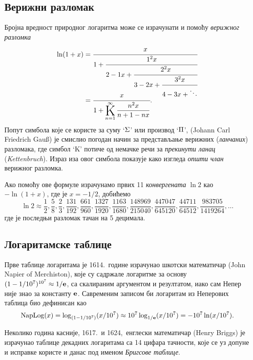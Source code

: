 \subsection{Верижни разломак}

Бројна вредност природног логаритма може се израчунати и помоћу {\sl верижног разломка}
\begin{equation}\label{eq:verige}
\begin{aligned}
\ln(1+x)
&=\cfrac{x}{1+\cfrac{1^2x}{2-1x+\cfrac{2^2x}{3-2x+\cfrac{3^2x}{4-3x+\ddots}}}}\\
\noalign{\vskip-12pt}
&=\cfrac{x}{1+ \Kinf{\n^2x}{\n+1-\n x}}.
\end{aligned}
\end{equation}
Попут симбола које се користе за суму `$\rm\Sigma$' или производ `$\rm\Pi$', 
 (Johann Carl Friedrich Gau\ss) је смислио погодан начин за представљање
верижних ({\sl ланчаних\/}) разломака,
где симбол `K' потиче од немачке речи за {\sl прекинути ланац\/} ({\sl Kettenbruch\/}).
Израз иза овог симбола показује како изгледа {\sl општи члан\/} верижног разломка.

\def\ff#1/#2,{\frac{#1}{#2},}
Ако помоћу ове формуле израчунамо првих 11 {\sl конвергената\/} $\ln2$ као $-\ln(1+x)$, 
где је $x=-1/2$,
добићемо
$$
\ln2\approx\ff1/2, \ff5/8, \ff2/3, \ff131/192, \ff661/960, \ff1327/1920, \ff1163/1680, \ff148969/215040, 
\ff447047/645120, \ff44711/64512, \ff983705/1419264, \dots
$$
где је последњи разломак тачан на 5 децимала.


\subsection{Логаритамске таблице}

Прве таблице логаритама је 1614.\ године 
израчунао шкотски математичар  (John Napier of Merchiston),
које су садржале логаритме за основу $(1-1/10^7)^{10^7} \approx1/{\bf e}$, 
са скалираним аргументом и резултатом,
иако сам Непер није знао за константу ${\bf e}$.
Савременим записом би логаритам из Неперових таблица био дефинисан као
$$
\mathop{\rm NapLog}\nolimits (x) = \log_{(1-1/10^7)}(x/10^7)
\approx 10^7\log_{1/{\bf e}}(x/10^7) = -10^7\ln(x/10^7).
$$

Неколико година касније, 1617.\ и 1624,\ 
енглески математичар  (Henry Briggs) је израчунао
таблице декадних логаритама са 14 цифара тачности, које се уз допуне и исправке
користе и данас под именом {\sl Бригсове таблице}.



